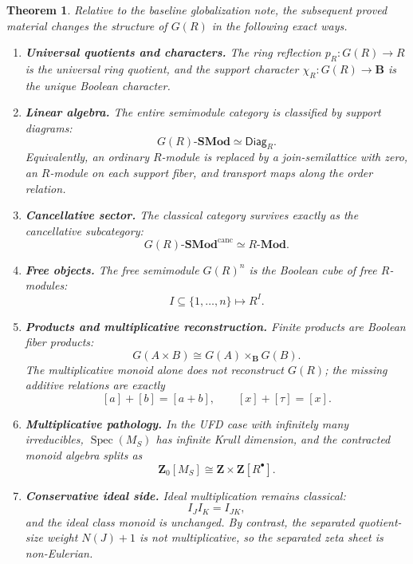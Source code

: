 \documentclass[11pt]{amsart}
\numberwithin{equation}{section}
\newtheorem{theorem}{Theorem}[section]
\theoremstyle{definition}
\newcommand{\B}{\mathbf B}
\newcommand{\Spec}{\operatorname{Spec}}
\newcommand{\Z}{\mathbf Z}
\newcommand{\Diag}{\mathsf{Diag}}
\newcommand{\SMod}{\mathbf{SMod}}
\newcommand{\Mod}{\mathbf{Mod}}
\begin{document}
\begin{theorem}\label{thm:final-synthesis}
Relative to the baseline globalization note, the subsequent proved material changes the structure of $G(R)$ in the following exact ways.
\begin{enumerate}[label=(\arabic*)]
    \item \textbf{Universal quotients and characters.}
    The ring reflection $p_R:G(R)\to R$ is the universal ring quotient, and the support character $\chi_R:G(R)\to\B$ is the unique Boolean character.

    \item \textbf{Linear algebra.}
    The entire semimodule category is classified by support diagrams:
    \[
    G(R)\text{-}\SMod\simeq \Diag_R.
    \]
    Equivalently, an ordinary $R$-module is replaced by a join-semilattice with zero, an $R$-module on each support fiber, and transport maps along the order relation.

    \item \textbf{Cancellative sector.}
    The classical category survives exactly as the cancellative subcategory:
    \[
    G(R)\text{-}\SMod^{\mathrm{canc}}\simeq R\text{-}\Mod.
    \]

    \item \textbf{Free objects.}
    The free semimodule $G(R)^n$ is the Boolean cube of free $R$-modules:
    \[
    I\subseteq\{1,\dots,n\}
    \longmapsto
    R^I.
    \]

    \item \textbf{Products and multiplicative reconstruction.}
    Finite products are Boolean fiber products:
    \[
    G(A\times B)\cong G(A)\times_{\B}G(B).
    \]
    The multiplicative monoid alone does not reconstruct $G(R)$; the missing additive relations are exactly
    \[
    [a]+[b]=[a+b],
    \qquad
    [x]+[\tau]=[x].
    \]

    \item \textbf{Multiplicative pathology.}
    In the UFD case with infinitely many irreducibles, $\Spec(M_S)$ has infinite Krull dimension, and the contracted monoid algebra splits as
    \[
    \Z_0[M_S]\cong \Z\times \Z[R^{\bullet}].
    \]

    \item \textbf{Conservative ideal side.}
    Ideal multiplication remains classical:
    \[
    I_JI_K=I_{JK},
    \]
    and the ideal class monoid is unchanged. By contrast, the separated quotient-size weight $N(J)+1$ is not multiplicative, so the separated zeta sheet is non-Eulerian.


\end{enumerate}
\end{theorem}
\end{document}
